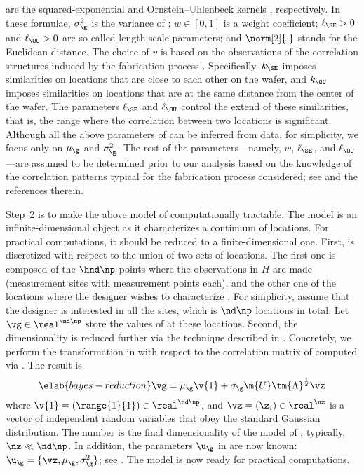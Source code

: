 are the squared-exponential and Ornstein--Uhlenbeck kernels
\cite{rasmussen2006}, respectively. In these formulae, $\sigma_\g^2$ is the
variance of \g; $w \in [0, 1]$ is a weight coefficient; $\ell_\SE > 0$ and
$\ell_\OU > 0$ are so-called length-scale parameters; and $\norm[2]{\cdot}$
stands for the Euclidean distance. The choice of $v$ is based on the
observations of the correlation structures induced by the fabrication process
\cite{chandrakasan2000, cheng2011}. Specifically, $k_\SE$ imposes similarities
on locations that are close to each other on the wafer, and $k_\OU$ imposes
similarities on locations that are at the same distance from the center of the
wafer. The parameters $\ell_\SE$ and $\ell_\OU$ control the extend of these
similarities, that is, the range where the correlation between two locations is
significant. Although all the above parameters of \g can be inferred from data,
for simplicity, we focus only on $\mu_\g$ and $\sigma_\g^2$. The rest of the
parameters---namely, $w$, $\ell_\SE$, and $\ell_\OU$---are assumed to be
determined prior to our analysis based on the knowledge of the correlation
patterns typical for the fabrication process considered; see \cite{marzouk2009}
and the references therein.

Step~2 is to make the above model of \g computationally tractable. The model is
an infinite-dimensional object as it characterizes a continuum of locations. For
practical computations, it should be reduced to a finite-dimensional one. First,
\g is discretized with respect to the union of two sets of locations. The first
one is composed of the $\hnd \np$ points where the observations in $H$ are made
(\hnd measurement sites with \np measurement points each), and the other one of
the locations where the designer wishes to characterize \g. For simplicity,
assume that the designer is interested in all the sites, which is $\nd \np$
locations in total. Let $\vg \in \real^{\nd \np}$ store the values of \g at
these locations. Second, the dimensionality is reduced further via the technique
described in . Concretely, we perform the
transformation in  with respect to the correlation
matrix of \vg computed via . The result is
\begin{equation} \elab{bayes-reduction}
  \vg = \mu_\g \v{1} + \sigma_\g \m{U} \tm{\Lambda}^\frac{1}{2} \vz
\end{equation}
where $\v{1} = (\range{1}{1}) \in \real^{\nd \np}$, and $\vz = (\z_i) \in
\real^\nz$ is a vector of independent random variables that obey the standard
Gaussian distribution. The number \nz is the final dimensionality of the model
of \g; typically, $\nz \ll \nd \np$. In addition, the parameters $\u_\g$ in
 are now known: $\u_\g = \{ \vz, \mu_\g, \sigma^2_\g
\}$; see . The model is now ready for practical
computations.

